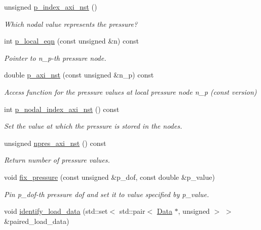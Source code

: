 \begin{DoxyCompactItemize}
unsigned \hyperlink{classoomph_1_1AxisymmetricTTaylorHoodElement_a353b5dbb889246ccc9cce5265951ada3}{p\+\_\+index\+\_\+axi\+\_\+nst} ()
\begin{DoxyCompactList}\small\item\em Which nodal value represents the pressure? \end{DoxyCompactList}\item 
int \hyperlink{classoomph_1_1AxisymmetricTTaylorHoodElement_a69d3da303d873ab134ec3e382fc919c0}{p\+\_\+local\+\_\+eqn} (const unsigned \&n) const
\begin{DoxyCompactList}\small\item\em Pointer to n\+\_\+p-\/th pressure node. \end{DoxyCompactList}\item 
double \hyperlink{classoomph_1_1AxisymmetricTTaylorHoodElement_ab08a53f82fad2eee4a016d3ebaba0a0a}{p\+\_\+axi\+\_\+nst} (const unsigned \&n\+\_\+p) const
\begin{DoxyCompactList}\small\item\em Access function for the pressure values at local pressure node n\+\_\+p (const version) \end{DoxyCompactList}\item 
int \hyperlink{classoomph_1_1AxisymmetricTTaylorHoodElement_a27deacb53ba98601b20dd06d9c812520}{p\+\_\+nodal\+\_\+index\+\_\+axi\+\_\+nst} () const
\begin{DoxyCompactList}\small\item\em Set the value at which the pressure is stored in the nodes. \end{DoxyCompactList}\item 
unsigned \hyperlink{classoomph_1_1AxisymmetricTTaylorHoodElement_a39217f9f550c3488f8f660ae861a61a7}{npres\+\_\+axi\+\_\+nst} () const
\begin{DoxyCompactList}\small\item\em Return number of pressure values. \end{DoxyCompactList}\item 
void \hyperlink{classoomph_1_1AxisymmetricTTaylorHoodElement_a8ae1c5e864429c8c08e7776a5851d042}{fix\+\_\+pressure} (const unsigned \&p\+\_\+dof, const double \&p\+\_\+value)
\begin{DoxyCompactList}\small\item\em Pin p\+\_\+dof-\/th pressure dof and set it to value specified by p\+\_\+value. \end{DoxyCompactList}\item 
void \hyperlink{classoomph_1_1AxisymmetricTTaylorHoodElement_a47a7f3c25a3e5c960510111418d13bbd}{identify\+\_\+load\+\_\+data} (std\+::set$<$ std\+::pair$<$ \hyperlink{classoomph_1_1Data}{Data} $\ast$, unsigned $>$ $>$ \&paired\+\_\+load\+\_\+data)

\end{DoxyCompactItemize}
